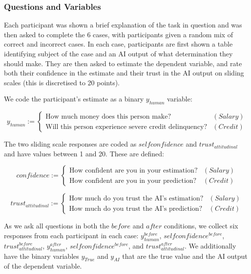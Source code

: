 \subsubsection{Questions and Variables}\label{sssec:q_and_v}
Each participant was shown a brief explanation of the task in question and was then asked to complete the 6 cases, with participants given a random mix of correct and incorrect cases. In each case, participants are first shown a table identifying subject of the case and an AI output of what determination they should make. They are then asked to estimate the dependent variable, and rate both their confidence in the estimate and their trust in the AI output on sliding scales (this is discretised to 20 points).

We code the participant's estimate as a binary $y_{human}$ variable:

\begin{equation}
    y_{human} := \begin{cases}
        \text{How much money does this person make?} & (Salary) \\
        \text{Will this person experience severe credit delinquency?} & (Credit)
    \end{cases}
\end{equation}

\noindent The two sliding scale responses are coded as $selfconfidence$ and $trust_{attitudinal}$ and have values between 1 and 20. These are defined:

\begin{equation}
    confidence := \begin{cases}
        \text{How confident are you in your estimation?} & (Salary) \\
        \text{How confident are you in your prediction?} & (Credit)
    \end{cases}
\end{equation}

\begin{equation}
    trust_{attitudinal} := \begin{cases}
        \text{How much do you trust the AI's estimation?} & (Salary) \\
        \text{How much do you trust the AI's prediction?} & (Credit)
    \end{cases}
\end{equation}

As we ask all questions in both the $before$ and $after$ conditions, we collect six responses from each participant in each case: $y_{human}^{before}$, $selfconfidence^{before}$, $trust_{attitudinal}^{before}$, $y_{human}^{after}$, $selfconfidence^{before}$, and $trust_{attitudinal}^{after}$.  We additionally have the binary variables $y_{True}$ and $y_{AI}$ that are the true value and the AI output of the dependent variable.

